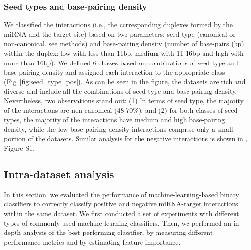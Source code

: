 \documentclass{bmcart}
\begin{document}
\subsubsection*{Seed types and base-pairing density}
We classified the interactions (i.e., the corresponding duplexes formed by the miRNA and the target site) based on two parameters: seed type (canonical or non-canonical, see methods) and base-pairing density (number of base-pairs (bp) within the duplex: low with less than 11bp, medium with 11-16bp and high with more than 16bp). We defined 6 classes based on combinations of seed type and base-pairing density and assigned each interaction to the appropriate class (Fig~\ref{fig:seed_type_pos}). As can be seen in the figure, the datasets are rich and diverse and include all the combinations of seed type and base-pairing density.
Nevertheless, two observations stand out: 
(1) In terms of seed type, the majority of the interactions are non-canonical (48-70\%); and (2) for both classes of seed types,  the majority of the interactions have medium and high base-pairing density, while the low base-pairing density interactions comprise only a small portion of the datasets. Similar analysis for the negative interactions is shown in , Figure S1.

\subsection*{Intra-dataset analysis} \label{nameref:indataset}
In this section, we evaluated the performance of machine-learning-based binary classifiers to correctly classify positive and negative miRNA-target interactions within the same dataset. 
We first conducted a set of experiments with different types of commonly used machine learning classifiers. Then, we performed an in-depth analysis of the best performing classifier, by measuring different performance metrics and by estimating feature importance.
\end{document}
